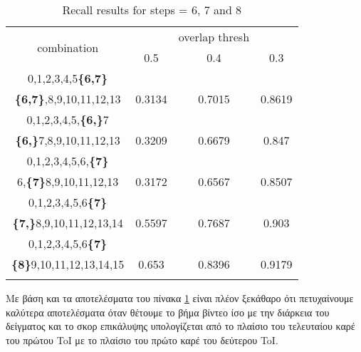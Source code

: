 \begin{center}
  \en
  \begin{longtable}{||c||c c c||}

  \hline
  \multirow{2}{5em}{combination} & {} &overlap thresh & {} \\
                                    &   0.5  &  0.4 &  0.3 \\         
  \hline  \hline
  0,1,2,3,4,5\textbf{\{6,7\}}           & {} & {} & {} \\
  \textbf{\{6,7\}},8,9,10,11,12,13      & 0.3134  & 0.7015 & 0.8619 \\
  \hline     \hline                          

  0,1,2,3,4,5,\textbf{\{6,\}}7          & {} & {} & {} \\
  \textbf{\{6,\}}7,8,9,10,11,12,13      & 0.3209  & 0.6679 & 0.847 \\
  \hline                          
  0,1,2,3,4,5,6,\textbf{\{7\}}          & {} & {} & {} \\
  6,\textbf{\{7\}}8,9,10,11,12,13       & 0.3172  & 0.6567 & 0.8507 \\
  \hline                          
  0,1,2,3,4,5,6\textbf{\{7\}}           & {} & {} & {} \\
  \textbf{\{7,\}}8,9,10,11,12,13,14     & 0.5597  & 0.7687 & 0.903 \\
  \hline                           
  0,1,2,3,4,5,6\textbf{\{7\}}           & {} & {} & {} \\
  \textbf{\{8\}}9,10,11,12,13,14,15     & 0.653	  & 0.8396 &0.9179  \\
  \hline                           
  \caption{Recall results for steps = 6, 7 and 8}
  \label{table:gr_step8_678 }
\end{longtable} 
\end{center}
Με βάση και τα αποτελέσματα του πίνακα \ref{table:gr_step8_678 } είναι πλέον ξεκάθαρο ότι πετυχαίνουμε καλύτερα αποτελέσματα όταν θέτουμε
το βήμα βίντεο ίσο με την διάρκεια του δείγματος και το σκορ επικάλυψης υπολογίζεται από το πλαίσιο του τελευταίου καρέ του πρώτου
\en ToI \gr με το πλαίσιο του πρώτο καρέ του δεύτερου \en ToI\gr.

